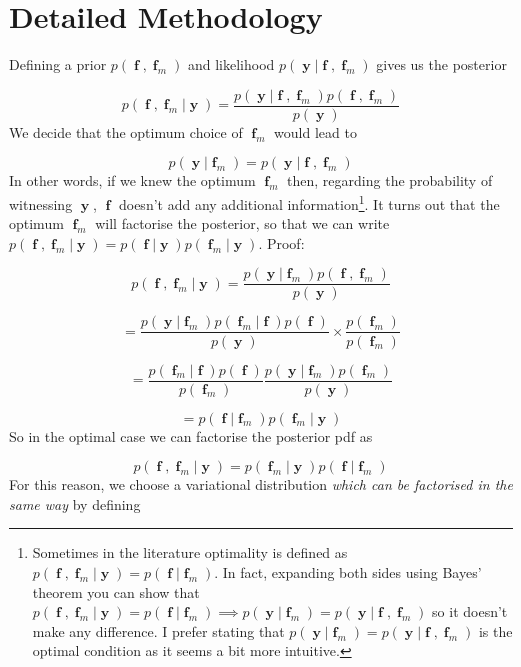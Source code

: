\documentclass[a4paper, 11pt]{article}
\DeclareMathOperator{\y}{\boldsymbol{y}}
\DeclareMathOperator{\f}{\boldsymbol{f}}
\begin{document}
\section{Detailed Methodology}\label{sec:details}
Defining a prior $p(\f,\f_m)$ and likelihood $p(\y|\f,\f_m)$ gives us the posterior

\begin{equation}
	p(\f,\f_m|\y) = \frac{p(\y|\f,\f_m)p(\f,\f_m)}{p(\y)}
\end{equation}
We decide that the optimum choice of $\f_m$ would lead to

\begin{equation}
	p(\y|\f_m) = p(\y|\f,\f_m)
\end{equation}
In other words, if we knew the optimum $\f_m$ then, regarding the probability of witnessing $\y$, $\f$ doesn't add any additional information\footnote{Sometimes in the literature optimality is defined as $p(\f,\f_m|\y)=p(\f|\f_m)$. In fact, expanding both sides using Bayes' theorem you can show that $p(\f,\f_m|\y)=p(\f|\f_m) \implies p(\y|\f_m) = p(\y|\f,\f_m)$ so it doesn't make any difference. I prefer stating that $p(\y|\f_m) = p(\y|\f,\f_m)$ is the optimal condition as it seems a bit more intuitive.}. It turns out that the optimum $\f_m$ will factorise the posterior, so that we can write $p(\f,\f_m|\y)=p(\f|\y)p(\f_m|\y)$. Proof:

\begin{equation}
	p(\f,\f_m|\y) = \frac{p(\y|\f_m)p(\f,\f_m)}{p(\y)} 
\end{equation}

\begin{equation}
	= \frac{p(\y|\f_m)p(\f_m|\f)p(\f)}{p(\y)} \times \frac{p(\f_m)}{p(\f_m)}
\end{equation}

\begin{equation}
	= \frac{p(\f_m|\f)p(\f)}{p(\f_m)} \frac{p(\y|\f_m)p(\f_m)}{p(\y)}
\end{equation}

\begin{equation}
	=p(\f|\f_m)p(\f_m|\y)
\end{equation}
So in the optimal case we can factorise the posterior pdf as

\begin{equation}
	p(\f,\f_m|\y) = p(\f_m|\y)p(\f|\f_m)
\end{equation}
For this reason, we choose a variational distribution \emph{which can be factorised in the same way} by defining
\end{document}
